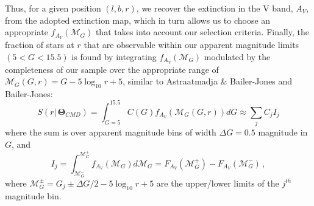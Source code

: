 \documentclass{nature}
\begin{document}
\begin{methods}
Thus, for a given position $(l,b,r)$, we recover the extinction in the V band, $A_V$, from the adopted extinction map\cite{Drimmel:2003}, which in turn allows us to choose an appropriate $f_{A_V}(\mathcal{M}_G)$ that takes into account our selection criteria. Finally, the fraction of stars at $r$ that are observable within our apparent magnitude limits $(5 < G < 15.5)$ is found by integrating $f_{A_V}(\mathcal{M}_G)$ modulated by the completeness of our sample over the appropriate range of $\mathcal{M}_G(G,r) =  G - 5 \log_{10}{r} + 5 $, similar to Astraatmadja \& Bailer-Jones\cite{Astr:2016} and Bailer-Jones\cite{BailerJones:2018c}:
\begin{equation}
S(r| \, \boldsymbol{\Theta}_{CMD}) = \int_{G=5}^{15.5} C(G) f_{A_V}(\mathcal{M}_G(G,r)) dG \approx \sum_j C_j I_j
\end{equation}
where the sum is over apparent magnitude bins of width $\Delta G = 0.5$ magnitude in $G$, and
\begin{equation}
I_j = \int_{\mathcal{M}^-_G}^{\mathcal{M}^+_G} f_{A_V}(\mathcal{M}_G) d\mathcal{M}_G = F_{A_V}(\mathcal{M}^+_G) - F_{A_V}(\mathcal{M}^-_G)\, ,
\end{equation}
where $\mathcal{M}^\pm_G = G_j \pm \Delta G/2 - 5 \log_{10}{r} + 5$ are the upper/lower limits of the $j^{th}$ magnitude bin.  


\end{methods}
\end{document}
